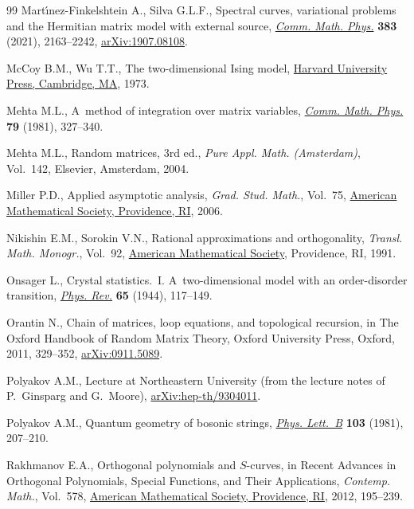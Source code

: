 \begin{thebibliography}{99}
Mart\'{\i}nez-Finkelshtein A., Silva G.L.F., Spectral curves, variational
 problems and the {H}ermitian matrix model with external source,
 \href{https://doi.org/10.1007/s00220-021-03999-y}{\textit{Comm. Math. Phys.}}
 \textbf{383} (2021), 2163--2242,
 \href{http://arxiv.org/abs/1907.08108}{arXiv:1907.08108}.

McCoy B.M., Wu T.T., The two-dimensional {I}sing model,
 \href{https://doi.org/10.4159/harvard.9780674180758}{Harvard University
 Press, Cambridge, MA}, 1973.

Mehta M.L., A~method of integration over matrix variables,
 \href{https://doi.org/10.1007/BF01208498}{\textit{Comm. Math. Phys.}}
 \textbf{79} (1981), 327--340.

Mehta M.L., Random matrices, 3rd ed., \textit{Pure Appl. Math. (Amsterdam)}, Vol.~142,
Elsevier, Amsterdam, 2004.

Miller P.D., Applied asymptotic analysis, \textit{Grad. Stud. Math.}, Vol.~75,
 \href{https://doi.org/10.1090/gsm/075}{American Mathematical Society,
 Providence, RI}, 2006.

Nikishin E.M., Sorokin V.N., Rational approximations and orthogonality,
 \textit{Transl. Math. Monogr.}, Vol.~92,
 \href{https://doi.org/10.1090/mmono/092}{American Mathematical Society},
 Providence, RI, 1991.

Onsager L., Crystal statistics.~{I}. {A}~two-dimensional model with an
 order-disorder transition,
 \href{https://doi.org/10.1103/PhysRev.65.117}{\textit{Phys. Rev.}}
 \textbf{65} (1944), 117--149.

Orantin N., Chain of matrices, loop equations, and topological recursion, in
 The {O}xford Handbook of Random Matrix Theory, Oxford University Press,
 Oxford, 2011, 329--352,
 \href{http://arxiv.org/abs/0911.5089}{arXiv:0911.5089}.

Polyakov A.M., Lecture at Northeastern University (from the lecture notes of
 P.~Ginsparg and G.~Moore),
 \href{http://arxiv.org/abs/hep-th/9304011}{arXiv:hep-th/9304011}.

Polyakov A.M., Quantum geometry of bosonic strings,
 \href{https://doi.org/10.1016/0370-2693(81)90743-7}{\textit{Phys. Lett.~B}}
 \textbf{103} (1981), 207--210.

Rakhmanov E.A., Orthogonal polynomials and {$S$}-curves, in Recent Advances in
 Orthogonal Polynomials, Special Functions, and Their Applications,
 \textit{Contemp. Math.}, Vol.~578,
 \href{https://doi.org/10.1090/conm/578/11484}{American Mathematical Society,
 Providence, RI}, 2012, 195--239.


\end{thebibliography}
